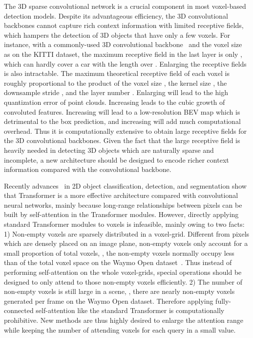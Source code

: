 \documentclass[10pt,twocolumn,letterpaper]{article}
\begin{document}
The 3D sparse convolutional network is a crucial component in most voxel-based detection models. Despite its advantageous efficiency, the 3D convolutional backbones cannot capture rich context information with limited receptive fields, which hampers the detection of 3D objects that have only a few voxels. For instance, with a commonly-used 3D convolutional backbone~\cite{yan2018second} and the voxel size as  on the KITTI dataset, the maximum receptive field in the last layer is only , which can hardly cover a car with the length over . Enlarging the receptive fields is also intractable. The maximum theoretical receptive field of each voxel is roughly proportional to the product of the voxel size , the kernel size , the downsample stride , and the layer number . Enlarging  will lead to the high quantization error of point clouds. Increasing  leads to the cubic growth of convoluted features. Increasing  will lead to a low-resolution BEV map which is detrimental to the box prediction, and increasing  will add much computational overhead. Thus it is computationally extensive to obtain large receptive fields for the 3D convolutional backbones. Given the fact that the large receptive field is heavily needed in detecting 3D objects which are naturally sparse and incomplete, a new architecture should be designed to encode richer context information compared with the convolutional backbone.   

Recently advances~\cite{dosovitskiy2020image, carion2020end, zheng2020rethinking} in 2D object classification, detection, and segmentation show that Transformer is a more effective architecture compared with convolutional neural networks, mainly because long-range relationships between pixels can be built by self-attention in the Transformer modules. However, directly applying standard Transformer modules to voxels is infeasible, mainly owing to two facts: 1) Non-empty voxels are sparsely distributed in a voxel-grid. Different from pixels which are densely placed on an image plane, non-empty voxels only account for a small proportion of total voxels, \eg, the non-empty voxels normally occupy less than  of the total voxel space on the Waymo Open dataset~\cite{sun2020scalability}. Thus instead of performing self-attention on the whole voxel-grids, special operations should be designed to only attend to those non-empty voxels efficiently. 2) The number of non-empty voxels is still large in a scene, \eg, there are nearly  non-empty voxels generated per frame on the Waymo Open dataset. Therefore applying fully-connected self-attention like the standard Transformer is computationally prohibitive. New methods are thus highly desired to enlarge the attention range while keeping the number of attending voxels for each query in a small value.   
\end{document}
